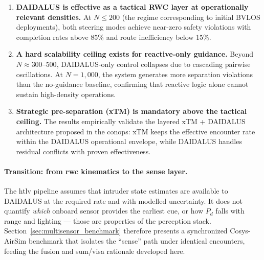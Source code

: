 \begin{enumerate}
    \item \textbf{DAIDALUS is effective as a tactical RWC layer at operationally relevant
    densities.} At $N \leq 200$ (the regime corresponding to initial BVLOS deployments),
    both steering modes achieve near-zero safety violations with completion rates above 85\%
    and route inefficiency below 15\%.

    \item \textbf{A hard scalability ceiling exists for reactive-only guidance.}
    Beyond $N \approx 300$--$500$, DAIDALUS-only control collapses due to cascading pairwise
    oscillations. At $N = 1{,}000$, the system generates more separation violations than the
    no-guidance baseline, confirming that reactive logic alone cannot sustain high-density
    operations.

    \item \textbf{Strategic pre-separation (xTM) is mandatory above the tactical ceiling.}
    The results empirically validate the layered xTM + DAIDALUS architecture proposed in the
    \gls{conops}: xTM keeps the effective encounter rate within the DAIDALUS operational
    envelope, while DAIDALUS handles residual conflicts with proven effectiveness.
\end{enumerate}

\paragraph{Transition: from \gls{rwc} kinematics to the sense layer.}
The \gls{htlv} pipeline assumes that intruder state estimates are available to DAIDALUS at
the required rate and with modelled uncertainty. It does not quantify \emph{which} onboard
sensor provides the earliest cue, or how $P_d$ falls with range and lighting --- those are
properties of the perception stack. Section~\ref{sec:multisensor_benchmark} therefore presents
a synchronized Cosys-AirSim benchmark that isolates the ``sense'' path under identical
encounters, feeding the fusion and \gls{sum}/\gls{visa} rationale developed here.
